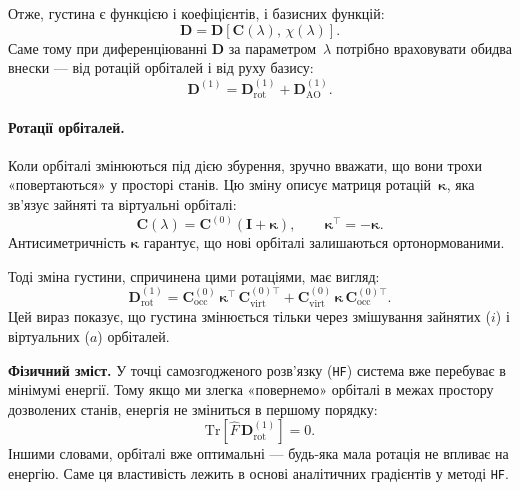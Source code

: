 Отже, густина є функцією і коефіцієнтів, і базисних функцій:
\[
\mathbf D = \mathbf D[\mathbf C(\lambda),\,\chi(\lambda)].
\]
Саме тому при диференціюванні $\mathbf D$ за параметром~$\lambda$
потрібно враховувати обидва внески --- від ротацій орбіталей і від руху базису:
\[
\mathbf D^{(1)} = \mathbf D^{(1)}_{\text{rot}} + \mathbf D^{(1)}_{\text{AO}}.
\]



\paragraph{Ротації орбіталей.}
Коли орбіталі змінюються під дією збурення, зручно вважати, що вони трохи «повертаються» у просторі станів.
Цю зміну описує матриця ротацій~$\boldsymbol\kappa$, яка зв’язує зайняті та віртуальні орбіталі:
\[
\mathbf C(\lambda) = \mathbf C^{(0)}(\mathbf I + \boldsymbol\kappa),
\qquad \boldsymbol\kappa^\top = -\boldsymbol\kappa.
\]
Антисиметричність $\boldsymbol\kappa$ гарантує, що нові орбіталі залишаються ортонормованими.

Тоді зміна густини, спричинена цими ротаціями, має вигляд:
\[
\mathbf D^{(1)}_{\text{rot}} =
\mathbf C_{\text{occ}}^{(0)}\,\boldsymbol\kappa^\top\,\mathbf C_{\text{virt}}^{(0)\top}
+ \mathbf C_{\text{virt}}^{(0)}\,\boldsymbol\kappa\,\mathbf C_{\text{occ}}^{(0)\top}.
\]
Цей вираз показує, що густина змінюється тільки через змішування зайнятих ($i$) і віртуальних ($a$) орбіталей.

\begin{commentbox}
\textbf{Фізичний зміст.}
У точці самозгодженого розв’язку (\texttt{HF}) система вже перебуває в мінімумі енергії.
Тому якщо ми злегка «повернемо» орбіталі в межах простору дозволених станів,
енергія не зміниться в першому порядку:
\[
\mathrm{Tr}[\hat F\,\mathbf D^{(1)}_{\text{rot}}]=0.
\]
Іншими словами, орбіталі вже оптимальні — будь-яка мала ротація не впливає на енергію.
Саме ця властивість лежить в основі аналітичних градієнтів у методі \texttt{HF}.
\end{commentbox}


